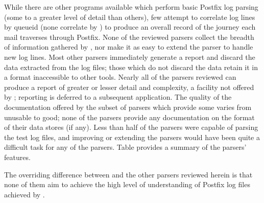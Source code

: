 While there are other programs available which perform basic Postfix log
parsing (some to a greater level of detail than others), few attempt to
correlate log lines by queueid (none correlate by \pid{}) to produce an
overall record of the journey each mail traverses through Postfix.  None of
the reviewed parsers collect the breadth of information gathered by
\parsername{}, nor make it as easy to extend the parser to handle new log
lines.  Most other parsers immediately generate a report and discard the
data extracted from the log files; those which do not discard the data
retain it in a format inaccessible to other tools.  Nearly all of the
parsers reviewed can produce a report of greater or lesser detail and
complexity, a facility not offered by \parsername{}; reporting is deferred
to a subsequent application.  The quality of the documentation offered by
the subset of parsers which provide some varies from unusable to good; none
of the parsers provide any documentation on the format of their data stores
(if any).  Less than half of the parsers were capable of parsing the
\numberOFlogFILES{} test log files, and improving or extending the parsers
would have been quite a difficult task for any of the parsers.  Table
 provides a summary of the
parsers' features.

The overriding difference between \parsername{} and the other parsers
reviewed herein is that none of them aim to achieve the high level of
understanding of Postfix log files achieved by \parsername{}.
